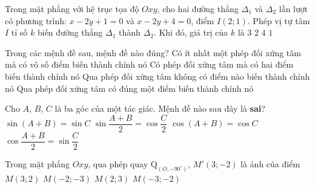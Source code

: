 \begin{ex}%
Trong mặt phẳng với hệ trục tọa độ $Oxy$, cho hai đường thẳng $\Delta_1$ và $\Delta_2$ lần lượt có phương trình: $x-2y+1=0$ và $x-2y+4=0$, điểm $I(2;1)$. Phép vị tự tâm $I$ tỉ số $k$ biến đường thẳng $\Delta_1$ thành $\Delta_2$. Khi đó, giá trị của $k$ là
	\choice
	{$3$}
	{$2$}
	{\True $4$}
	{$1$}
\end{ex}

\begin{ex}%
Trong các mệnh đề sau, mệnh đề nào đúng?
	\choice
	{Có ít nhất một phép đối xứng tâm mà có vô số điểm biến thành chính nó}
	{Có phép đối xứng tâm mà có hai điểm biến thành chính nó}
	{Qua phép đối xứng tâm không có điểm nào biến thành chính nó}
	{\True Qua phép đối xứng tâm có đúng một điểm biến thành chính nó}
\end{ex}

\begin{ex}%
Cho $A$, $B$, $C$ là ba góc của một tác giác. Mệnh đề nào sau đây là \textbf{sai}?
	\choice
	{$\sin(A+B)=\sin C$}
	{$\sin\dfrac{A+B}{2}=\cos\dfrac{C}{2}$}
	{\True $\cos(A+B)=\cos C$}
	{$\cos\dfrac{A+B}{2}=\sin\dfrac{C}{2}$}
\end{ex}

\begin{ex}%
	Trong mặt phẳng $Oxy$, qua phép quay $\mathrm{Q}_{\left(O,-90^\circ\right)}$, $M'(3;-2)$ là ảnh của điểm
	\choice
	{$M(3;2)$}
	{$M(-2;-3)$}
	{\True $M(2;3)$}
	{$M(-3;-2)$}
\end{ex}

